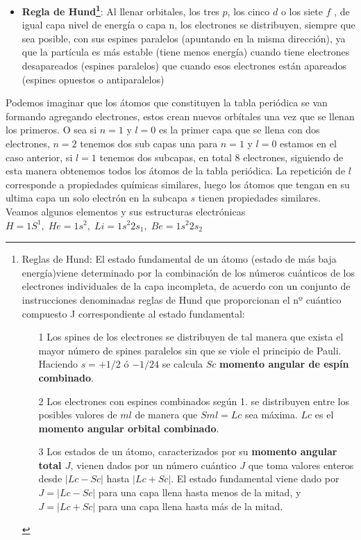 \begin{itemize}
	\item \textbf{Regla de Hund\footnote{Reglas de Hund: El estado fundamental de un átomo (estado de más baja energía)viene determinado por la combinación de los números cuánticos de los electrones individuales de la capa incompleta, de acuerdo con un conjunto de instrucciones denominadas reglas de Hund que proporcionan el nº cuántico compuesto J correspondiente al estado fundamental:
\begin{itemize}	
\item[1] Los spines de los electrones se distribuyen de tal manera que exista el mayor número de spines paralelos sin que se viole el principio de Pauli. Haciendo $s = +1/2$ ó $-1/24$ se calcula $Sc$ \textbf{momento angular de espín combinado}.
\item[2] Los electrones con espines combinados según 1. se distribuyen entre los posibles valores de $ml$ de manera que $Sml = Lc$ sea máxima. $Lc$ es el \textbf{momento angular orbital combinado}.
\item[3] Los estados de un átomo, caracterizados por su \textbf{momento angular total $J$}, vienen dados por un número cuántico $J$ que toma valores enteros desde $|Lc - Sc|$ hasta $|Lc + Sc|$. El estado fundamental viene dado por $J = |Lc - Sc|$ para una capa llena hasta menos de la mitad, y $J= |Lc + Sc|$ para una capa llena hasta más de la mitad.
\end{itemize}}}: Al llenar orbitales, los tres $p$, los cinco $d$ o los siete $f$ , de igual capa nivel de energía o capa n, los electrones se distribuyen, siempre que sea posible, con sus espines paralelos (apuntando en la misma dirección), ya que la partícula es más estable (tiene menos energía) cuando tiene electrones desapareados (espines paralelos) que cuando esos electrones están apareados (espines opuestos o antiparalelos)
\end{itemize}

Podemos imaginar que los átomos que constituyen la tabla periódica se van formando agregando electrones, estos crean nuevos orbítales una vez que se llenan los primeros. O sea si $n=1$ y $l=0$ es la primer capa que se llena con dos electrones, $n=2$ tenemos dos sub capas una para $n=1$ y $l=0$ estamos en el caso anterior, si $l=1$ tenemos dos subcapas, en total 8 electrones, siguiendo de esta manera obtenemos todos los átomos de la tabla periódica. La repetición de $l$ corresponde a  propiedades químicas similares, luego los átomos que tengan en su ultima capa un solo electrón en la subcapa $s$ tienen propiedades similares. Veamos algunos elementos y sus estructuras electrónicas $H= 1S^{1}, \; He=1s^{2}, \; Li=1s^{2}2s_{1}, \; Be=1s^{2}2s_{2}$


